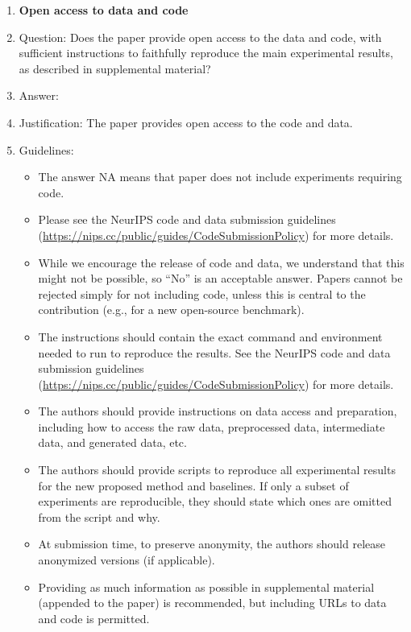 \documentclass{article}
\begin{document}
\begin{enumerate}
\item {\bf Open access to data and code}
    \item[] Question: Does the paper provide open access to the data and code, with sufficient instructions to faithfully reproduce the main experimental results, as described in supplemental material?
    \item[] Answer: \answerYes{} %
    \item[] Justification: The paper provides open access to the code and data.
    \item[] Guidelines:
    \begin{itemize}
        \item The answer NA means that paper does not include experiments requiring code.
        \item Please see the NeurIPS code and data submission guidelines (\url{https://nips.cc/public/guides/CodeSubmissionPolicy}) for more details.
        \item While we encourage the release of code and data, we understand that this might not be possible, so “No” is an acceptable answer. Papers cannot be rejected simply for not including code, unless this is central to the contribution (e.g., for a new open-source benchmark).
        \item The instructions should contain the exact command and environment needed to run to reproduce the results. See the NeurIPS code and data submission guidelines (\url{https://nips.cc/public/guides/CodeSubmissionPolicy}) for more details.
        \item The authors should provide instructions on data access and preparation, including how to access the raw data, preprocessed data, intermediate data, and generated data, etc.
        \item The authors should provide scripts to reproduce all experimental results for the new proposed method and baselines. If only a subset of experiments are reproducible, they should state which ones are omitted from the script and why.
        \item At submission time, to preserve anonymity, the authors should release anonymized versions (if applicable).
        \item Providing as much information as possible in supplemental material (appended to the paper) is recommended, but including URLs to data and code is permitted.
    \end{itemize}



\end{enumerate}
\end{document}
